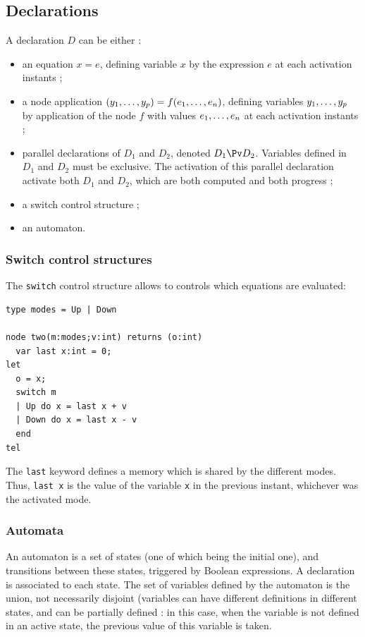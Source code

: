 \documentclass[a4paper]{article}
\begin{document}
\subsection{Declarations}
\label{sec:declarations}

A declaration $D$ can be either :
\begin{itemize}
\item an equation $x = e$, defining variable $x$ by the expression $e$ at each
  activation instants ;
\item a node application $(\tonp{y}{,}) = f(\ton{e}{,})$, defining variables
  $\tonp{y}{,}$ by application of the node $f$ with values $\ton{e}{,}$ at each
  activation instants ;
\item parallel declarations of $D_1$ and $D_2$, denoted $D_1\Pv D_2$.
 Variables defined in $D_1$ and $D_2$ must be
  exclusive. The activation of this parallel declaration activate both $D_1$ and
  $D_2$, which are both computed and both progress ;
\item a switch control structure ;
\item an automaton.
\end{itemize}

\subsubsection{Switch control structures}
\label{sec:switch-contr-struct}

The \texttt{switch} control structure allows to controls which equations are
evaluated:

\begin{lstlisting}
type modes = Up | Down

node two(m:modes;v:int) returns (o:int)
  var last x:int = 0;
let
  o = x;
  switch m
  | Up do x = last x + v
  | Down do x = last x - v
  end
tel
\end{lstlisting}

The \texttt{last} keyword defines a memory which is shared by the different
modes. Thus, \lstinline|last x| is the value of the variable \texttt{x} in the
previous instant, whichever was the activated mode.

\subsubsection{Automata}
\label{sec:automata}

An automaton is a set of states (one of which being the initial one), and
transitions between these states, triggered by Boolean expressions. A
declaration is associated to each state. The set of variables defined by the
automaton is the union, not necessarily disjoint (variables can have different
definitions in different states, and can be partially defined : in this case,
when the variable is not defined in an active state, the previous value of this
variable is taken.
\end{document}
